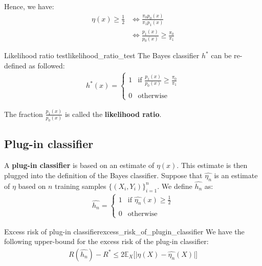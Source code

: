 \noindent\newline Hence, we have:
\begin{align*}
    \eta(x) \ge \frac{1}{2} &\iff \frac{\pi_0p_0(x)}{\pi_1p_1(x)} \\
        &\iff \frac{p_1(x)}{p_0(x)} \ge \frac{\pi_0}{\pi_1}
\end{align*}

\begin{proposition}{Likelihood ratio test}{likelihood_ratio_test}
    The Bayes classifier $h^*$ can be re-defined as followed:
    \begin{align*}
        h^*(x) = \begin{cases}
            1 & \text{if } \frac{p_1(x)}{p_0(x)} \ge \frac{\pi_0}{\pi_1}
            \\ \\
            0 & \text{otherwise}
        \end{cases}
    \end{align*}

    \noindent The fraction $\frac{p_1(x)}{p_0(x)}$ is called the \textbf{likelihood ratio}.
\end{proposition}


\subsection{Plug-in classifier}
\begin{definition}
    A \textbf{plug-in classifier} is based on an estimate of $\eta(x)$. This estimate is then plugged into the definition of the Bayes classifier. Suppose that $\widehat{\eta_n}$ is an estimate of $\eta$ based on $n$ training samples $\{(X_i, Y_i)\}_{i=1}^n$. We define $\widehat{h_n}$ as:
    \begin{align*}
        \widehat{h_n} = \begin{cases}
            1 & \text{if } \widehat{\eta_n}(x) \ge \frac{1}{2}
            \\ \\
            0 & \text{otherwise}
        \end{cases}
    \end{align*}
\end{definition}

\begin{corollary}{Excess risk of plug-in classifier}{excess_risk_of_plugin_classifier}
    We have the following upper-bound for the excess risk of the plug-in classifier:
    \begin{align*}
        R(\widehat{h_n}) - R^* \le 2 \mathbb{E}_X\Big[ \Big| \eta(X) - \widehat{\eta_n}(X) \Big| \Big]
    \end{align*}
\end{corollary}

